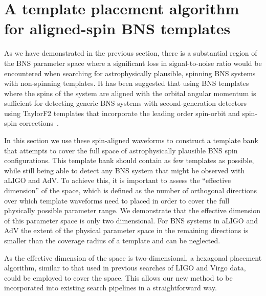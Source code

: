 \section{A template placement algorithm for aligned-spin BNS templates}
\label{sec:param_space}

As we have demonstrated in the previous section, there is a substantial region
of the BNS parameter space where a significant loss in signal-to-noise ratio
would be encountered when searching for astrophysically plausible, spinning
BNS systems with non-spinning templates. It has been suggested that using BNS
templates where the spins of the system are aligned with the orbital angular
momentum is sufficient for detecting generic BNS systems with second-generation
detectors~\cite{Ajith:2011ec} using TaylorF2 templates that incorporate the
leading order spin-orbit and spin-spin corrections~\cite{PW95}. 

In this section we use these spin-aligned waveforms to construct a template
bank that attempts to cover the full space of astrophysically plausible BNS
spin configurations. This template bank should contain as few templates as
possible, while still being able to detect any BNS system that might be
observed with aLIGO and AdV. To achieve this, it is important to assess the
``effective dimension'' of the space, which is defined as the number of orthogonal
directions
over which template waveforms need to placed in order to cover the full physically
possible parameter range. 
We demonstrate that the effective dimension
of this parameter space is only two dimensional. For BNS systems in aLIGO and AdV
the extent of the physical parameter space in the remaining directions is smaller
than the coverage radius of a template and can be neglected.

As the effective dimension of the space is two-dimensional, a
hexagonal placement algorithm, similar to that used in previous searches of
LIGO and Virgo data, could be employed to cover the space. This allows our new
method to be incorporated into existing search pipelines in a straightforward
way.


